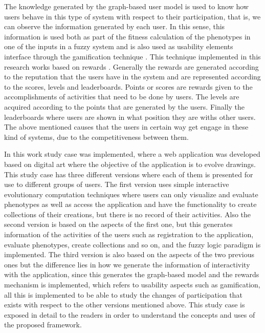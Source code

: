 \par The knowledge generated by the graph-based user model is used to know how users
behave in this type of system with respect to their participation, that is, we
can observe the information generated by each user. In this sense, this
information is used both as part of the fitness calculation of the phenotypes in
one of the inputs in a fuzzy system and is also used as usability elements
interface through the gamification technique \cite{huotari2012defining,
deterding2011game, hickman2010total, mcgonigal2011reality}. This technique
implemented in this research works based on rewards \cite{sutter2010browse}.
Generally the rewards are generated according to the reputation that the users
have in the system and are represented according to the scores, levels and
leaderboards. Points or scores are rewards given to the accomplishments of
activities that need to be done by users. The levels are acquired according to
the points that are generated by the users. Finally the leaderboards where users
are shown in what position they are withs other users. The above
mentioned causes that the users in certain way get engage in these kind of
systems, due to the competitiveness between them.

\par In this work study case  was implemented, where a web application was
developed based on digital art where the objective of the application is to
evolve drawings. This study case has three different versions where each of them
is presented for use to different groups of users. The first version uses simple
interactive evolutionary computation techniques where users can only visualize
and evaluate phenotypes as well as access the application and have the
functionality to create collections of their creations, but there is no record
of their activities. Also the second version is based on the aspects of the
first one, but this generates information of the activities of the users such as
registration to the application, evaluate phenotypes, create collections and so
on, and the fuzzy logic paradigm is implemented.  The third version is also
based on the aspects of the two previous ones but the difference lies in how we
generate the information of interactivity with the application, since this
generates the graph-based model and the rewards mechanism is implemented, which
refers to usability aspects such as gamification, all this is implemented to be
able to study the changes of participation that exists with respect to the other
versions mentioned above. This study case is exposed in detail to the readers in
order to understand the concepts and uses of the proposed framework.

